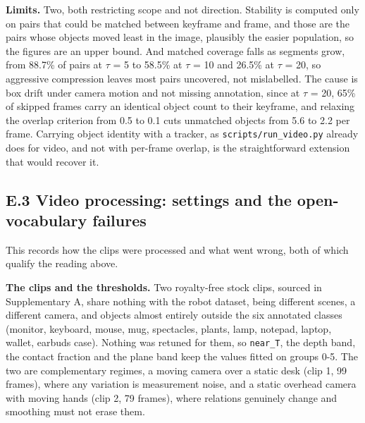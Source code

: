 \textbf{Limits.} Two, both restricting scope and not direction. Stability is computed only on pairs that could be matched between keyframe and frame, and those are the pairs whose objects moved least in the image, plausibly the easier population, so the figures are an upper bound. And matched coverage falls as segments grow, from 88.7\% of pairs at $\tau$ = 5 to 58.5\% at $\tau$ = 10 and 26.5\% at $\tau$ = 20, so aggressive compression leaves most pairs uncovered, not mislabelled. The cause is box drift under camera motion and not missing annotation, since at $\tau$ = 20, 65\% of skipped frames carry an identical object count to their keyframe, and relaxing the overlap criterion from 0.5 to 0.1 cuts unmatched objects from 5.6 to 2.2 per frame. Carrying object identity with a tracker, as \texttt{scripts/run\_\allowbreak{}video.py} already does for video, and not with per-frame overlap, is the straightforward extension that would recover it.

\subsection{E.3 Video processing: settings and the open-vocabulary failures}

This records how the clips were processed and what went wrong, both of which qualify the reading above.

\textbf{The clips and the thresholds.} Two royalty-free stock clips, sourced in Supplementary A, share nothing with the robot dataset, being different scenes, a different camera, and objects almost entirely outside the six annotated classes (monitor, keyboard, mouse, mug, spectacles, plants, lamp, notepad, laptop, wallet, earbuds case). Nothing was retuned for them, so \texttt{near\_\allowbreak{}T}, the depth band, the contact fraction and the plane band keep the values fitted on groups 0-5. The two are complementary regimes, a moving camera over a static desk (clip 1, 99 frames), where any variation is measurement noise, and a static overhead camera with moving hands (clip 2, 79 frames), where relations genuinely change and smoothing must not erase them.

